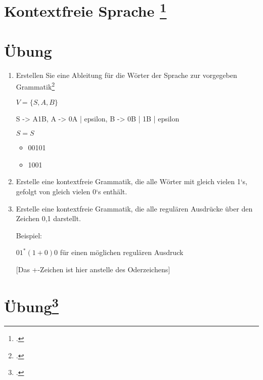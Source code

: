 \documentclass{lehramt-informatik-aufgabe}
\begin{document}
\section{Kontextfreie Sprache
\footcite{theo:fs:2}}

\section{Übung}
\begin{enumerate}
\item Erstellen Sie eine Ableitung für die Wörter der Sprache zur
vorgegeben Grammatik\footcite[Seite 10]{theo:fs:2}

$V = \{ S, A, B \}$


\begin{liProduktionsRegeln}
S -> A1B,
A -> 0A | epsilon,
B -> 0B | 1B | epsilon
\end{liProduktionsRegeln}

$S = S$

\begin{itemize}
\item 00101
\item 1001
\end{itemize}

\item Erstelle eine kontextfreie Grammatik, die alle Wörter mit gleich
vielen 1‘s, gefolgt von gleich vielen 0‘s enthält.

\item Erstelle eine kontextfreie Grammatik, die alle regulären Ausdrücke
über den Zeichen 0,1 darstellt.

Beispiel:

$01^* (1 + 0)0$ für einen möglichen regulären Ausdruck

[Das +-Zeichen ist hier anstelle des Oderzeichens]

\end{enumerate}

%

\section{Übung\footcite[Seite 18]{theo:fs:2}}
\end{document}
